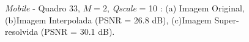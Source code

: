 \begin{figure}[h]
    \centering
    \qquad
    \qquad
    \caption{\textit{Mobile} - Quadro 33, $M = 2$, \textit{Qscale} = 10 : (a) Imagem Original, (b)Imagem Interpolada (PSNR = 26.8 dB), (c)Imagem Super-resolvida (PSNR = 30.1 dB).}
	  
    \label{fig:6}
\end{figure}







